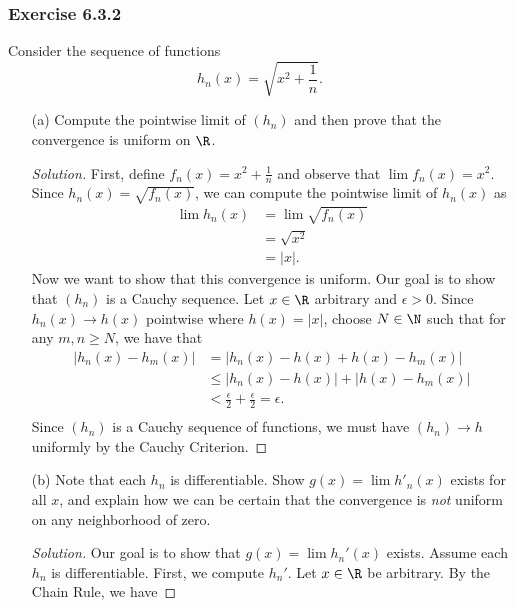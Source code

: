 \subsubsection{Exercise 6.3.2} Consider the sequence of functions 
\[  h_n(x) = \sqrt{ x^2 + \frac{ 1 }{ n }  }. \]
\begin{enumerate}
    \item[(a)] Compute the pointwise limit of \( (h_n)  \) and then prove that the convergence is uniform on \( \R  \). 
        \begin{proof}[Solution]
        First, define \( f_n(x) = x^2 + \frac{ 1 }{ n }  \) and observe that \( \lim f_n(x) = x^2 \). Since \( h_n(x) = \sqrt{ f_n(x)  }  \), we can compute the pointwise limit of \( h_n(x)  \) as 
        \begin{align*}
            \lim h_n(x) &= \lim \sqrt{ f_n(x)  }   \\
                        &= \sqrt{ x^2  } \\
                        &= | x  |.
        \end{align*}
        Now we want to show that this convergence is uniform. Our goal is to show that \( (h_n)  \) is a Cauchy sequence. Let \( x \in \R  \) arbitrary and \( \epsilon > 0  \). Since \( h_n(x) \to h(x)  \) pointwise where \( h(x) = | x  |    \), choose \( N \in \N  \) such that for any \( m,n \geq N  \), we have that 
        \begin{align*}
            | h_n(x) - h_m(x) | &= | h_n(x) - h(x) + h(x) - h_m(x) |  \\
                                &\leq | h_n(x) - h(x)  | + | h(x) - h_m(x) | \\
                                &< \frac{ \epsilon  }{ 2 } + \frac{ \epsilon  }{ 2 } = \epsilon. \\
        \end{align*}
        Since \( (h_n)  \) is a Cauchy sequence of functions, we must have \( (h_n) \to h  \) uniformly by the Cauchy Criterion.
        \end{proof}
    \item[(b)] Note that each \( h_n  \) is differentiable. Show \( g(x) = \lim h'_n(x)  \) exists for all \( x  \), and explain how we can be certain that the convergence is \textit{not} uniform on any neighborhood of zero.
        \begin{proof}[Solution]
        Our goal is to show that \( g(x) = \lim h_n'(x)  \) exists. Assume each \( h_n  \) is differentiable. First, we compute \( h_n'  \). Let \( x \in \R  \) be arbitrary. By the Chain Rule, we have

\end{proof}
\end{enumerate}
